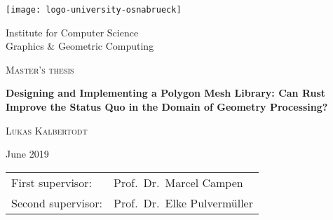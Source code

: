 \begin{titlepage}
  \begin{center}
  \vspace{4mm}
  \texttt{[image: logo-university-osnabrueck]}
  \vspace{4mm}

  \Large{Institute for Computer Science}\\[2mm]
  \Large{Graphics \& Geometric Computing}


  \vspace{25mm}

  \LARGE{\textsc{Master's thesis}}

  \vspace{3mm}

  \Huge{\textsf{\textbf{
    Designing and Implementing a Polygon Mesh Library: Can Rust Improve the Status
    Quo in the Domain of Geometry Processing?
  }}}


  \vfill

  \LARGE{\textsc{Lukas Kalbertodt}}

  \vspace{5mm}

  \large{June 2019}
  \vfill

  \begin{tabular}{ll}
    First supervisor:  & Prof.\ Dr.\ Marcel Campen \\
    Second supervisor: & Prof.\ Dr.\ Elke Pulvermüller
  \end{tabular}
  \end{center}
\end{titlepage}
